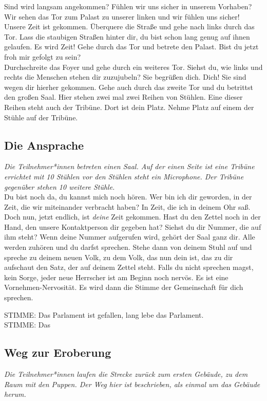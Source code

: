 \documentclass[a4paper, 12pt]{report}
\begin{document}
Sind wird langsam angekommen? 
Fühlen wir uns sicher in unserem Vorhaben?
Wir sehen das Tor zum Palast zu unserer linken und wir fühlen uns sicher! 
Unsere Zeit ist gekommen.
Überquere die Straße und gehe nach links durch das Tor. 
Lass die staubigen Straßen hinter dir, du bist schon lang genug auf ihnen gelaufen. 
Es wird Zeit!
Gehe durch das Tor und betrete den Palast.
Bist du jetzt froh mir gefolgt zu sein? \\

Durchschreite das Foyer und gehe durch ein weiteres Tor. 
Siehst du, wie links und rechts die Menschen stehen dir zuzujubeln?
Sie begrüßen dich. Dich! Sie sind wegen dir hierher gekommen.
Gehe auch durch das zweite Tor und du betrittst den großen Saal. 
Hier stehen zwei mal zwei Reihen von Stühlen. 
Eine dieser Reihen steht auch der Tribüne. 
Dort ist dein Platz. 
Nehme Platz auf einem der Stühle auf der Tribüne.

\subsection{Die Ansprache}
\textit{Die Teilnehmer*innen betreten einen Saal. Auf der einen Seite ist eine Tribüne errichtet mit 10 Stühlen vor den Stühlen steht ein Microphone. Der Tribüne gegenüber stehen 10 weitere Stühle.}\\

Du bist noch da, du kannst mich noch hören.
Wer bin ich dir geworden, in der Zeit, die wir miteinander verbracht haben?
In Zeit, die ich in deinem Ohr saß.
Doch nun, jetzt endlich, ist \textit{deine} Zeit gekommen. 
Hast du den Zettel noch in der Hand, den unsere Kontaktperson dir gegeben hat?
Siehst du dir Nummer, die auf ihm steht?
Wenn deine Nummer aufgerufen wird, gehört der Saal ganz dir.
Alle werden zuhören und du darfst sprechen. 
Stehe dann von deinem Stuhl auf und spreche zu deinem neuen Volk, zu dem Volk, das nun dein ist,
das zu dir aufschaut den Satz, der auf deinem Zettel steht.
Falls du nicht sprechen magst, kein Sorge, jeder neue Herrscher ist am Beginn noch nervös.
Es ist eine Vornehmen-Nervosität. 
Es wird dann die Stimme der Gemeinschaft für dich sprechen.

STIMME: Das Parlament ist gefallen, lang lebe das Parlament.\\
STIMME: Das


\subsection{Weg zur Eroberung}
\textit{Die Teilnehmer*innen laufen die Strecke zurück zum ersten Gebäude, zu dem Raum mit den Puppen. Der Weg hier ist beschrieben, als einmal um das Gebäude herum.}\\
\end{document}
